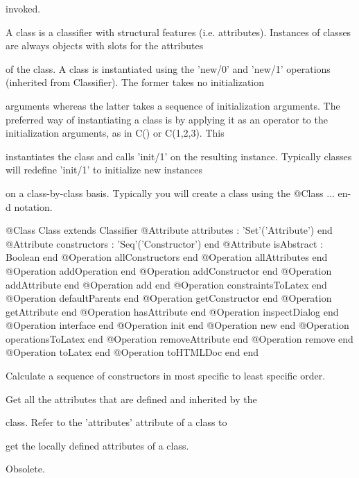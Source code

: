      invoked.

      A class is a classifier with structural features (i.e. attributes).
      Instances of classes are always objects with slots for the attributes

      of the class. A class is instantiated using the 'new/0' and 'new/1'
      operations (inherited from Classifier). The former takes no initialization

      arguments whereas the latter takes a sequence of initialization arguments.
      The preferred way of instantiating a class is by applying it as an 
      operator to the initialization arguments, as in C() or C(1,2,3). This

      instantiates the class and calls 'init/1' on the resulting instance.
      Typically classes will redefine 'init/1' to initialize new instances

      on a class-by-class basis. Typically you will create a class using the 
      @Class ... en-d notation.
\begin{Interface}
@Class Class extends Classifier
  @Attribute attributes : 'Set'('Attribute') end
  @Attribute constructors : 'Seq'('Constructor') end
  @Attribute isAbstract : Boolean end
  @Operation allConstructors end
  @Operation allAttributes end
  @Operation addOperation end
  @Operation addConstructor end
  @Operation addAttribute end
  @Operation add end
  @Operation constraintsToLatex end
  @Operation defaultParents end
  @Operation getConstructor end
  @Operation getAttribute end
  @Operation hasAttribute end
  @Operation inspectDialog end
  @Operation interface end
  @Operation init end
  @Operation new end
  @Operation operationsToLatex end
  @Operation removeAttribute end
  @Operation remove end
  @Operation toLatex end
  @Operation toHTMLDoc end
end
\end{Interface}

      Calculate a sequence of constructors in most specific 
      to least specific order.

      Get all the attributes that are defined and inherited by the

      class. Refer to the 'attributes' attribute of a class to

      get the locally defined attributes of a class.

       Obsolete.

